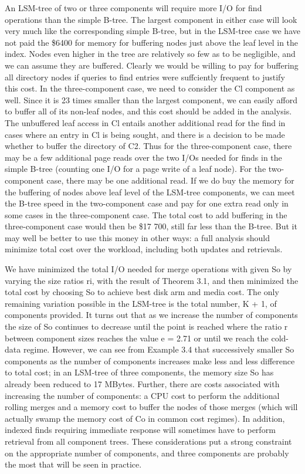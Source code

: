 \documentclass[a4paper,11pt,notitlepage,twoside,openright]{article}
\begin{document}
An LSM-tree of two or three components will require more I/O for find
operations than the simple B-tree. The largest component in either case
will look very much like the corresponding simple B-tree, but in the
LSM-tree case we have not paid the \$6400 for memory for buffering nodes
just above the leaf level in the index. Nodes even higher in the tree
are relatively so few as to be negligible, and we can assume they are
buffered. Clearly we would be willing to pay for buffering all directory
nodes if queries to find entries were suffciently frequent to justify
this cost. In the three-component case, we need to consider the Cl
component as well. Since it is 23 times smaller than the largest
component, we can easily afford to buffer all of its non-leaf nodes, and
this cost should be added in the analysis. The unbuffered leaf access in
Cl entails another additional read for the find in cases where an entry
in Cl is being sought, and there is a decision to be made whether to
buffer the directory of C2. Thus for the three-component case, there may
be a few additional page reads over the two I/Os needed for finds in the
simple B-tree (counting one I/O for a page write of a leaf node). For
the two-component case, there may be one additional read. If we do buy
the memory for the buffering of nodes above leaf level of the LSM-tree
components, we can meet the B-tree speed in the two-component case and
pay for one extra read only in some cases in the three-component case.
The total cost to add buffering in the three-component case would then
be \$17 700, still far less than the B-tree. But it may well be better
to use this money in other ways: a full analysis should minimize total
cost over the workload, including both updates and retrievals.

We have minimized the total I/O needed for merge operations with given
So by varying the size ratios ri, with the result of Theorem 3.1, and
then minimized the total cost by choosing So to achieve best disk arm
and media cost. The only remaining variation possible in the LSM-tree is
the total number, K + 1, of components provided. It turns out that as we
increase the number of components the size of So continues to decrease
until the point is reached where the ratio r between component sizes
reaches the value e = 2.71 or until we reach the cold-data regime.
However, we can see from Example 3.4 that successively smaller So
components as the number of components increases make less and less
difference to total cost; in an LSM-tree of three components, the memory
size So has already been reduced to 17 MBytes. Further, there are costs
associated with increasing the number of components: a CPU cost to
perform the additional rolling merges and a memory cost to buffer the
nodes of those merges (which will actually swamp the memory cost of Co
in common cost regimes). In addition, indexed finds requiring immediate
response will sometimes have to perform retrieval from all component
trees. These considerations put a strong constraint on the appropriate
number of components, and three components are probably the most that
will be seen in practice.
\end{document}
